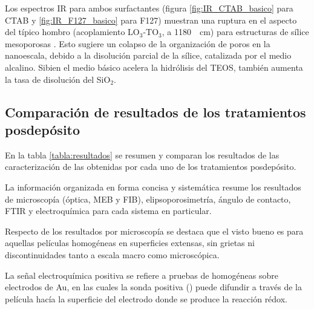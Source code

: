 		 Los espectros IR para ambos surfactantes (figura \ref{fig:IR_CTAB_basico} para CTAB y \ref{fig:IR_F127_basico} para F127) muestran una ruptura en el aspecto del típico hombro (acoplamiento LO$_3$-TO$_3$, a \SI{1180}{\per\cm}) para estructuras de sílice mesoporosas \cite{Olsen1989,Innocenzi2003,Angelome2008}. Esto sugiere un colapso de la organización de poros en la nanoescala, debido a la disolución parcial de la sílice, catalizada por el medio alcalino. Si\space bien el medio básico acelera la hidrólisis del TEOS, también aumenta la tasa de disolución del SiO$_2$.\cite{Mazer1994,Niibori2000,Gorrepati2010}

	 \subsection{Comparación de resultados de los tratamientos posdepósito}
	 		
	 		En la tabla \ref{tabla:resultados} se resumen y comparan los resultados de las caracterización de las \pdm\space obtenidas por cada uno de los tratamientos posdepósito. 

	 		La información organizada en forma concisa y sistemática resume los resultados de microscopía (óptica, MEB y FIB), elipsoporosimetría, ángulo de contacto, FTIR y electroquímica para cada sistema en particular. 

	 		Respecto de los resultados por microscopía se destaca que el visto bueno es para aquellas películas homogéneas en superficies extensas, sin grietas ni discontinuidades tanto a escala macro como microscópica. 

	 		La señal electroquímica positiva se refiere a pruebas de \pdm\space homogéneas sobre electrodos de Au, en las cuales la sonda positiva (\aminorutenio) puede difundir a través de la película hacía la superficie del electrodo donde se produce la reacción rédox.

